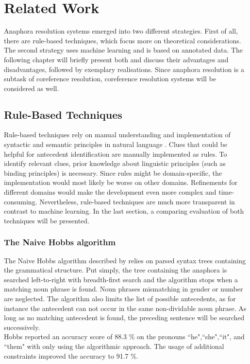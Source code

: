 \chapter{Related Work}
\label{sec:Related Work}

Anaphora resolution systems emerged into two different strategies. First of all, there are rule-based techniques, which focus more on theoretical considerations. The second strategy uses machine learning and is based on annotated data. The following chapter will briefly present both and discuss their advantages and disadvantages, followed by exemplary realisations. Since anaphora resolution is a subtask of coreference resolution, coreference resolution systems will be considered as well.

\section{Rule-Based Techniques}
Rule-based techniques rely on manual understanding and implementation of syntactic and semantic principles in natural language \citep{kennedy1996anaphora,mitkov1994integrated,ingria1989computational}. Clues that could be helpful for antecedent identification are manually implemented as rules. To identify relevant clues, prior knowledge about linguistic principles (such as binding principles) is necessary. Since rules might be domain-specific, the implementation would most likely be worse on other domains. Refinements for different domains would make the development even more complex and time-consuming. Nevertheless, rule-based techniques are much more transparent in contrast to machine learning. In the last section, a comparing evaluation of both techniques will be presented.

\subsection{The Naive Hobbs algorithm}
The Naive Hobbs algorithm described by \citep{hobbs1978resolving} relies on parsed syntax trees containing the grammatical structure. Put simply, the tree containing the anaphora is searched left-to-right with breadth-first search and the algorithm stops when a matching noun phrase is found. Noun phrases mismatching in gender or number are neglected. The algorithm also limits the list of possible antecedents, as for instance the antecedent can not occur in the same non-dividable noun phrase. As long as no matching antecedent is found, the preceding sentence will be searched successively. \\
Hobbs reported an accuracy score of 88.3 \% on the pronouns “he",“she",“it", and “them" with only using the algorithmic approach. The usage of additional constraints improved the accuracy to 91.7 \%.

